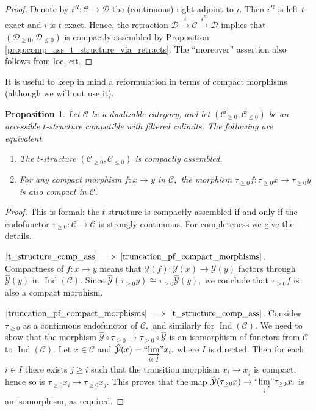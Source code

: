 \documentclass[11pt,leqno]{amsart}
\newcommand{\Implies}[2]{$\text{\ref{#1}}\implies\text{\ref{#2}}$}
\newtheorem{prop}[theo]{Proposition}
\numberwithin{equation}{section}
\newcommand{\indlim}[1][]{\mathop{\varinjlim}\limits_{#1}}
\newcommand{\inddlim}[1][]{{``{\indlim[#1]}"}}
\newcommand{\xto}{\xrightarrow}
\newcommand{\cD}{{\mathcal D}}
\newcommand{\cC}{{\mathcal C}}
\newcommand{\cY}{{\mathcal Y}}
\newcommand{\Ind}{\operatorname{Ind}}
\begin{document}
\begin{proof}
Denote by $i^R:\cC\to\cD$ the (continuous) right adjoint to $i.$ Then $i^R$ is left $t$-exact and $i$ is $t$-exact. Hence, the retraction $\cD\xto{i}\cC\xto{i^R}\cD$ implies that $(\cD_{\geq 0},\cD_{\leq 0})$ is compactly assembled by Proposition \ref{prop:comp_ass_t_structure_via_retracts}. The ``moreover'' assertion also follows from loc. cit.
\end{proof}

It is useful to keep in mind a reformulation in terms of compact morphisms (although we will not use it).

\begin{prop}\label{prop:comp_ass_t_structures_via_compact_morphisms}
Let $\cC$ be a dualizable category, and let $(\cC_{\geq 0},\cC_{\leq 0})$ be an accessible $t$-structure compatible with filtered colimits. The following are equivalent.
\begin{enumerate}[label=(\roman*),ref=(\roman*)]
	\item The $t$-structure $(\cC_{\geq 0},\cC_{\leq 0})$ is compactly assembled. \label{t_structure_comp_ass}
	\item For any compact morphism $f:x\to y$ in $\cC,$ the morphism $\tau_{\geq 0}f:\tau_{\geq 0}x\to\tau_{\geq 0}y$ is also compact in $\cC.$ \label{truncation_pf_compact_morphisms}
\end{enumerate} 
\end{prop}

\begin{proof}
This is formal: the $t$-structure is compactly assembled if and only if the endofunctor $\tau_{\geq 0}:\cC\to\cC$ is strongly continuous. For completeness we give the details.
	
\Implies{t_structure_comp_ass}{truncation_pf_compact_morphisms}. Compactness of $f:x\to y$ means that $\cY(f):\cY(x)\to\cY(y)$ factors through $\hat{\cY}(y)$ in $\Ind(\cC).$ Since $\hat{\cY}(\tau_{\geq 0}y)\cong \tau_{\geq 0}\hat{\cY}(y),$ we conclude that $\tau_{\geq 0}f$ is also a compact morphism.

\Implies{truncation_pf_compact_morphisms}{t_structure_comp_ass}. Consider $\tau_{\geq 0}$ as a continuous endofunctor of $\cC,$ and similarly for $\Ind(\cC).$ We need to show that the morphism $\hat{\cY}\circ\tau_{\geq 0}\to\tau_{\geq 0}\circ\hat{\cY}$ is an isomorphism of functors from $\cC$ to $\Ind(\cC).$ Let $x\in\cC$ and $\hat{\cY}(x)=\inddlim[i\in I]x_i,$ where $I$ is directed. Then for each $i\in I$ there exists $j\geq i$ such that the transition morphism $x_i\to x_j$ is compact, hence so is $\tau_{\geq 0}x_i\to\tau_{\geq 0}x_j.$ This proves that the map $\hat{\cY}(\tau_{\geq 0}x)\to\inddlim[i]\tau_{\geq 0}x_i$ is an isomorphism, as required.
\end{proof}
\end{document}
